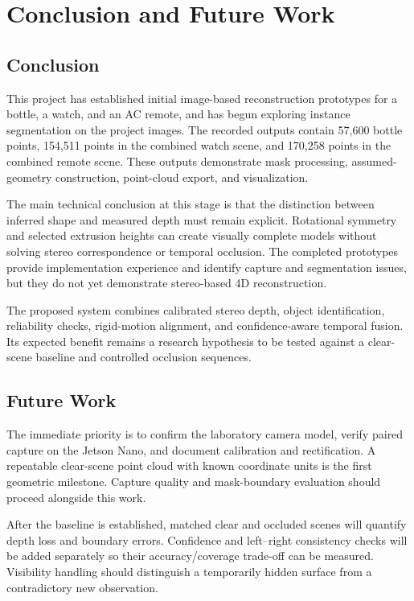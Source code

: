 \chapter{Conclusion and Future Work}
\section{Conclusion}
This project has established initial image-based reconstruction prototypes for a bottle, a watch, and an AC remote, and has begun exploring instance segmentation on the project images. The recorded outputs contain 57,600 bottle points, 154,511 points in the combined watch scene, and 170,258 points in the combined remote scene. These outputs demonstrate mask processing, assumed-geometry construction, point-cloud export, and visualization.

The main technical conclusion at this stage is that the distinction between inferred shape and measured depth must remain explicit. Rotational symmetry and selected extrusion heights can create visually complete models without solving stereo correspondence or temporal occlusion. The completed prototypes provide implementation experience and identify capture and segmentation issues, but they do not yet demonstrate stereo-based 4D reconstruction.

The proposed system combines calibrated stereo depth, object identification, reliability checks, rigid-motion alignment, and confidence-aware temporal fusion. Its expected benefit remains a research hypothesis to be tested against a clear-scene baseline and controlled occlusion sequences.

\section{Future Work}
The immediate priority is to confirm the laboratory camera model, verify paired capture on the Jetson Nano, and document calibration and rectification. A repeatable clear-scene point cloud with known coordinate units is the first geometric milestone. Capture quality and mask-boundary evaluation should proceed alongside this work.

After the baseline is established, matched clear and occluded scenes will quantify depth loss and boundary errors. Confidence and left--right consistency checks will be added separately so their accuracy/coverage trade-off can be measured. Visibility handling should distinguish a temporarily hidden surface from a contradictory new observation.

